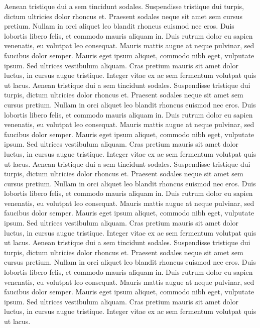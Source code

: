 Aenean tristique dui a sem tincidunt sodales. Suspendisse tristique dui turpis, dictum ultricies dolor rhoncus et. Praesent sodales neque sit amet sem cursus pretium. Nullam in orci aliquet leo blandit rhoncus euismod nec eros. Duis lobortis libero felis, et commodo mauris aliquam in. Duis rutrum dolor eu sapien venenatis, eu volutpat leo consequat. Mauris mattis augue at neque pulvinar, sed faucibus dolor semper. Mauris eget ipsum aliquet, commodo nibh eget, vulputate ipsum. Sed ultrices vestibulum aliquam. Cras pretium mauris sit amet dolor luctus, in cursus augue tristique. Integer vitae ex ac sem fermentum volutpat quis ut lacus.
Aenean tristique dui a sem tincidunt sodales. Suspendisse tristique dui turpis, dictum ultricies dolor rhoncus et. Praesent sodales neque sit amet sem cursus pretium. Nullam in orci aliquet leo blandit rhoncus euismod nec eros. Duis lobortis libero felis, et commodo mauris aliquam in. Duis rutrum dolor eu sapien venenatis, eu volutpat leo consequat. Mauris mattis augue at neque pulvinar, sed faucibus dolor semper. Mauris eget ipsum aliquet, commodo nibh eget, vulputate ipsum. Sed ultrices vestibulum aliquam. Cras pretium mauris sit amet dolor luctus, in cursus augue tristique. Integer vitae ex ac sem fermentum volutpat quis ut lacus.
Aenean tristique dui a sem tincidunt sodales. Suspendisse tristique dui turpis, dictum ultricies dolor rhoncus et. Praesent sodales neque sit amet sem cursus pretium. Nullam in orci aliquet leo blandit rhoncus euismod nec eros. Duis lobortis libero felis, et commodo mauris aliquam in. Duis rutrum dolor eu sapien venenatis, eu volutpat leo consequat. Mauris mattis augue at neque pulvinar, sed faucibus dolor semper. Mauris eget ipsum aliquet, commodo nibh eget, vulputate ipsum. Sed ultrices vestibulum aliquam. Cras pretium mauris sit amet dolor luctus, in cursus augue tristique. Integer vitae ex ac sem fermentum volutpat quis ut lacus.
Aenean tristique dui a sem tincidunt sodales. Suspendisse tristique dui turpis, dictum ultricies dolor rhoncus et. Praesent sodales neque sit amet sem cursus pretium. Nullam in orci aliquet leo blandit rhoncus euismod nec eros. Duis lobortis libero felis, et commodo mauris aliquam in. Duis rutrum dolor eu sapien venenatis, eu volutpat leo consequat. Mauris mattis augue at neque pulvinar, sed faucibus dolor semper. Mauris eget ipsum aliquet, commodo nibh eget, vulputate ipsum. Sed ultrices vestibulum aliquam. Cras pretium mauris sit amet dolor luctus, in cursus augue tristique. Integer vitae ex ac sem fermentum volutpat quis ut lacus.

